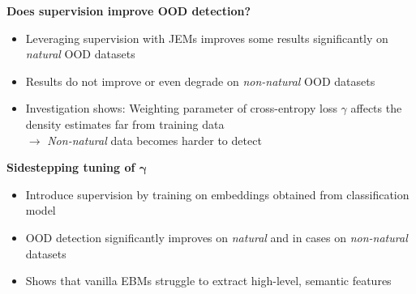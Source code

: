 \documentclass[landscape,a0paper,fontscale=0.292]{baposter}
\begin{document}
\begin{poster}
{\begin{minipage}[t]{0.48\linewidth}
    \textbf{\color{blue}Does supervision improve OOD detection?}
    \begin{center}
        \resizebox{.5\textwidth}{!}{
            
        }
    \end{center}
    \begin{itemize}
        \item Leveraging supervision with JEMs improves some results significantly on \textit{natural} OOD datasets
        \item Results do not improve or even degrade on \textit{non-natural} OOD datasets
        \item Investigation shows: Weighting parameter of cross-entropy loss \(\gamma \) affects the density estimates far from training data \\
        \(\rightarrow \) \textit{Non-natural} data becomes harder to detect
    \end{itemize}
    \begin{center}
    \end{center}
    \end{minipage}%
    \hfill
    \begin{minipage}[t]{.48\linewidth}
        \textbf{\small \color{blue}Sidestepping tuning of \(\boldsymbol{\gamma} \)}
        \begin{center}
        \resizebox{0.5\textwidth}{!}{
        
        }
        \end{center}
        \begin{itemize}
            \item Introduce supervision by training on embeddings obtained from classification model
            \item OOD detection significantly improves on \textit{natural} and in cases on \textit{non-natural} datasets
            \item Shows that vanilla EBMs struggle to extract high-level, semantic features
        \end{itemize}


\end{minipage}}
\end{poster}
\end{document}
